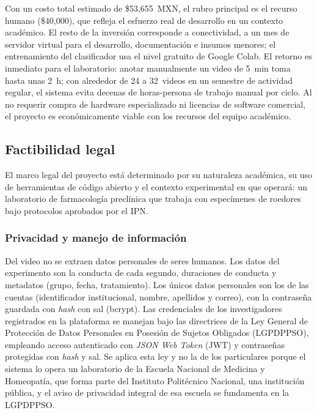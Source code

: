 Con un costo total estimado de \$53{,}655~MXN, el rubro principal es el recurso
humano (\$40{,}000), que refleja el esfuerzo real de desarrollo en un contexto
académico. El resto de la inversión corresponde a conectividad, a un mes de servidor virtual para el desarrollo, documentación e insumos menores;
el entrenamiento del clasificador usa el nivel gratuito de Google Colab. El
retorno es inmediato para el laboratorio: anotar manualmente un video de 5~min toma
hasta unas 2~h; con alrededor de 24 a 32~videos en un semestre de actividad regular,
el sistema evita decenas de horas-persona de trabajo manual por ciclo. Al no requerir compra de hardware
especializado ni licencias de software comercial, el proyecto es económicamente viable
con los recursos del equipo académico.

\subsection{Factibilidad legal}

El marco legal del proyecto está determinado por su naturaleza académica, su uso de
herramientas de código abierto y el contexto experimental en que operará: un laboratorio
de farmacología preclínica que trabaja con especímenes de roedores bajo protocolos
aprobados por el IPN.

\subsubsection{Privacidad y manejo de información}

Del video no se extraen datos personales de seres humanos. Los datos del experimento
son la conducta de cada segundo, duraciones de conducta y metadatos (grupo, fecha,
tratamiento). Los únicos datos personales son los de las cuentas (identificador
institucional, nombre, apellidos y correo), con la contraseña guardada con \textit{hash}
con sal (bcrypt). Las credenciales de los investigadores
registrados en la plataforma se manejan bajo las directrices de la Ley General de
Protección de Datos Personales en Posesión de Sujetos Obligados (LGPDPPSO), empleando
acceso autenticado con \textit{JSON Web Token} (JWT) y contraseñas protegidas con \textit{hash} y sal.
Se aplica esta ley y no la de los particulares porque el sistema lo opera un laboratorio de la Escuela
Nacional de Medicina y Homeopatía, que forma parte del Instituto Politécnico Nacional, una institución
pública, y el aviso de privacidad integral de esa escuela se fundamenta en la LGPDPPSO.

